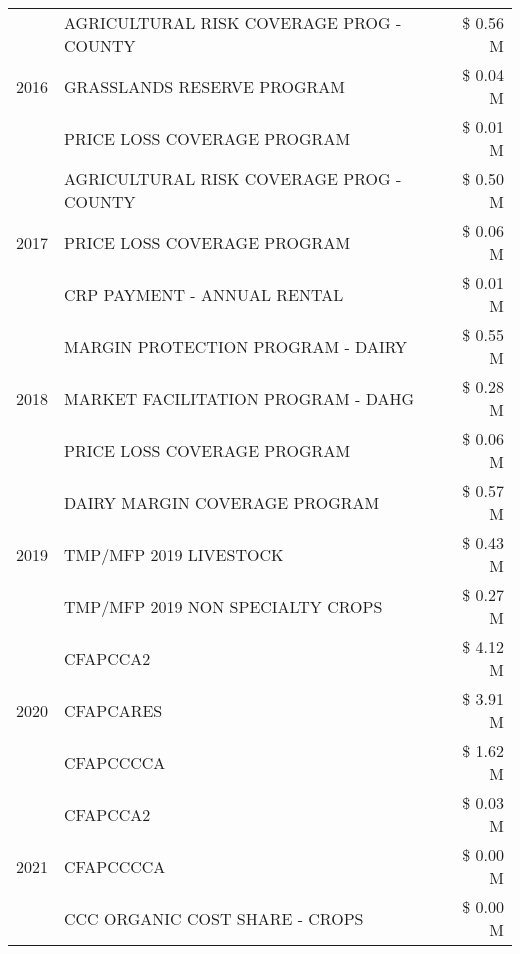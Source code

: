 \begin{tabular}{llr}
\cline{1-3}
\multirow[t]{3}{*}{2016} & AGRICULTURAL RISK COVERAGE PROG - COUNTY & \$ 0.56 M \\
 & GRASSLANDS RESERVE PROGRAM & \$ 0.04 M \\
 & PRICE LOSS COVERAGE PROGRAM & \$ 0.01 M \\
\cline{1-3}
\multirow[t]{3}{*}{2017} & AGRICULTURAL RISK COVERAGE PROG - COUNTY & \$ 0.50 M \\
 & PRICE LOSS COVERAGE PROGRAM & \$ 0.06 M \\
 & CRP PAYMENT - ANNUAL RENTAL & \$ 0.01 M \\
\cline{1-3}
\multirow[t]{3}{*}{2018} & MARGIN PROTECTION PROGRAM - DAIRY & \$ 0.55 M \\
 & MARKET FACILITATION PROGRAM - DAHG & \$ 0.28 M \\
 & PRICE LOSS COVERAGE PROGRAM & \$ 0.06 M \\
\cline{1-3}
\multirow[t]{3}{*}{2019} & DAIRY MARGIN COVERAGE PROGRAM & \$ 0.57 M \\
 & TMP/MFP 2019 LIVESTOCK & \$ 0.43 M \\
 & TMP/MFP 2019 NON SPECIALTY CROPS & \$ 0.27 M \\
\cline{1-3}
\multirow[t]{3}{*}{2020} & CFAPCCA2 & \$ 4.12 M \\
 & CFAPCARES & \$ 3.91 M \\
 & CFAPCCCCA & \$ 1.62 M \\
\cline{1-3}
\multirow[t]{3}{*}{2021} & CFAPCCA2 & \$ 0.03 M \\
 & CFAPCCCCA & \$ 0.00 M \\
 & CCC ORGANIC COST SHARE - CROPS & \$ 0.00 M \\
\cline{1-3}
\bottomrule
\end{tabular}

